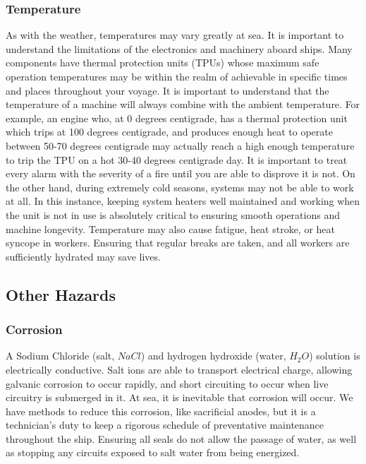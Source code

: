 \documentclass[11pt,a4paper]{article}
\begin{document}
\subsubsection{Temperature}
As with the weather, temperatures may vary greatly at sea. It is important to understand the limitations of the electronics and machinery aboard ships. Many components have thermal protection units (TPUs) whose maximum safe operation temperatures may be within the realm of achievable in specific times and places throughout your voyage. It is important to understand that the temperature of a machine will always combine with the ambient temperature. For example, an engine who, at 0 degrees centigrade, has a thermal protection unit which trips at 100 degrees centigrade, and produces enough heat to operate between 50-70 degrees centigrade may actually reach a high enough temperature to trip the TPU on a hot 30-40 degrees centigrade day. It is important to treat every alarm with the severity of a fire until you are able to disprove it is not. On the other hand, during extremely cold seasons, systems may not be able to work at all. In this instance, keeping system heaters well maintained and working when the unit is not in use is absolutely critical to ensuring smooth operations and machine longevity. Temperature may also cause fatigue, heat stroke, or heat syncope in workers. Ensuring that regular breaks are taken, and all workers are sufficiently hydrated may save lives.
\subsection{Other Hazards}
\subsubsection{Corrosion}
A Sodium Chloride (salt, $NaCl$) and hydrogen hydroxide (water, $H_2O$) solution is electrically conductive. Salt ions are able to transport electrical charge, allowing galvanic corrosion to occur rapidly, and short circuiting to occur when live circuitry is submerged in it. At sea, it is inevitable that corrosion will occur. We have methods to reduce this corrosion, like sacrificial anodes, but it is a technician's duty to keep a rigorous schedule of preventative maintenance throughout the ship. Ensuring all seals do not allow the passage of water, as well as stopping any circuits exposed to salt water from being energized.
\end{document}
